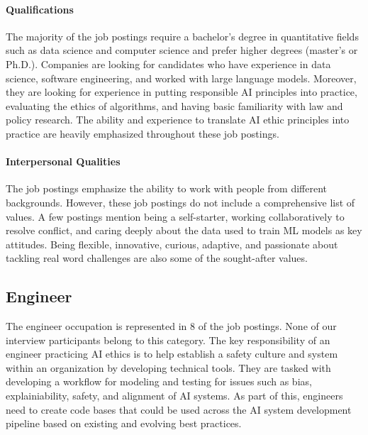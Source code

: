 \documentclass[sigconf]{acmart}
\begin{document}
\paragraph{Qualifications} 
The majority of the job postings require a bachelor's degree in quantitative fields such as data science and computer science and prefer higher degrees (master's or Ph.D.). Companies are looking for candidates who have experience in data science, software engineering, and worked with large language models. Moreover, they are looking for experience in putting responsible \ac{AI} principles into practice, evaluating the ethics of algorithms, and having basic familiarity with law and policy research. The ability and experience to translate \ac{AI} ethic principles into practice are heavily emphasized throughout these job postings. 

\paragraph{Interpersonal Qualities}
 The job postings emphasize the ability to work with people from different backgrounds. However, these job postings do not include a comprehensive list of values. A few postings mention being a self-starter, working collaboratively to resolve conflict, and caring deeply about the data used to train ML models as key attitudes. Being flexible, innovative, curious, adaptive, and passionate about tackling real word challenges are also some of the sought-after values.%

\subsection{Engineer}

The engineer occupation is represented in 8 of the job postings. None of our interview participants belong to this category. The key responsibility of an engineer practicing \ac{AI} ethics is to help establish a safety culture and system within an organization by developing technical tools. They are tasked with developing a workflow for modeling and testing for issues such as bias, explainiability, safety, and alignment of \ac{AI} systems. As part of this, engineers need to create code bases that could be used across the \ac{AI} system development pipeline based on existing and evolving best practices.
\end{document}
